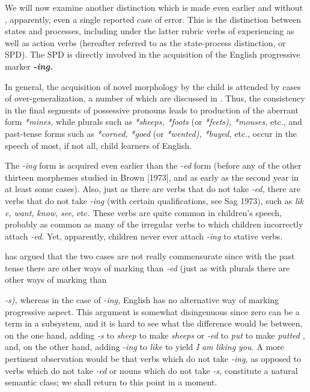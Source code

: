 We will now examine another distinction which is made even earlier and without , apparently, even a single reported case of error. This is the distinction between states and processes, including under the latter rubric verbs of experiencing as well as action verbs (hereafter referred to as the state-process distinction, or SPD). The SPD is di\-rectly involved in the acquisition of the English progressive marker
\textbf{\textit{-ing.}}



In general, the acquisition of novel morphology by the child is attended by cases of over-generalization, a number of which are dis\-cussed in \citet{Cazden1968}. Thus, the consistency in the final segments of possessive pronouns leads to production of the aberrant form \textit{*mines,} while plurals such as \textit{*sheeps,} \textit{*foots} (or \textit{*feets}\textit{),} \textit{*mouses,} etc., and past-tense forms such as \textit{*corned,} \textit{*goed} (or \textit{*wented}\textit{),} \textit{*buyed, }etc., occur in the speech of most, if not all, child learners of English.

The \textit{-i}\textit{n}\textit{g }form is acquired even earlier than the \textit{-ed} form (before
any of the other thirteen morphemes studied in Brown [1973], and as early as the second year in at least some cases). Also, just as there are verbs that do not take \textit{-ed,} there are verbs that do not take \textit{-ing} (with certain qualifications, see Sag 1973), such as \textit{lik} \textit{e,} \textit{want,} \textit{know,} \textit{see,} etc. These verbs are quite common in children's speech, probably as common as many of the irregular verbs to which children incor\-rectly attach \textit{-ed.} Yet, apparently, children never ever attach \textit{-ing} to stative verbs.

\citet{Kuczaj1978} has argued that the two cases are not really commensurate since with the past tense there are other ways of mark\-ing than \textit{-ed }(just as with plurals there are other ways of marking than

\textit{-}\textit{s}\textit{),} whereas in the case of \textit{-ing,} English has no alternative way of marking progressive aspect. This argument is somewhat disingenuous since zero can be a term in a subsystem, and it is hard to see what the difference would be between, on the one hand, adding \textit{-s} to \textit{sheep }to make \textit{sheeps} or \textit{-ed} to \textit{put} to make \textit{putted} , and, on the other hand, adding \textit{-ing} to \textit{like} to yield \textit{I} \textit{am} \textit{liking} \textit{you. }A more pertinent observa\-tion would be that verbs which do not take \textit{-ing,} as opposed to verbs which do not take \textit{-ed} or nouns which do not take \textit{-s,} constitute a natural semantic class; we shall return to this point in a moment.

